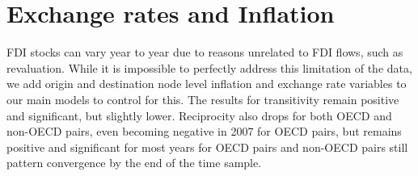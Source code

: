 \documentclass[reqno,onecolumn,letterpaper,12pt]{article}
\begin{document}
{\section{Exchange rates and Inflation}\label{xrresults}

FDI stocks can vary year to year due to reasons unrelated to FDI flows, such as revaluation. While it is impossible to perfectly address this limitation of the data, we add origin and destination node level inflation and exchange rate variables to our main models to control for this. The results for transitivity remain positive and significant, but slightly lower. Reciprocity also drops for both OECD and non-OECD pairs, even becoming negative in 2007 for OECD pairs, but remains positive and significant for most years for OECD pairs and non-OECD pairs still pattern convergence by the end of the time sample.\\


}
\end{document}
